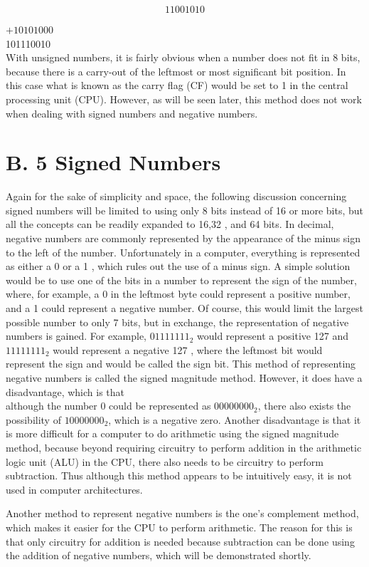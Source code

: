 \documentclass[10pt]{book}
\begin{document}
$$
11001010
$$

$+10101000$\\
101110010\\
With unsigned numbers, it is fairly obvious when a number does not fit in 8 bits, because there is a carry-out of the leftmost or most significant bit position. In this case what is known as the carry flag (CF) would be set to 1 in the central processing unit (CPU). However, as will be seen later, this method does not work when dealing with signed numbers and negative numbers.

\section{B. 5 Signed Numbers}
Again for the sake of simplicity and space, the following discussion concerning signed numbers will be limited to using only 8 bits instead of 16 or more bits, but all the concepts can be readily expanded to 16,32 , and 64 bits. In decimal, negative numbers are commonly represented by the appearance of the minus sign to the left of the number. Unfortunately in a computer, everything is represented as either a 0 or a 1 , which rules out the use of a minus sign. A simple solution would be to use one of the bits in a number to represent the sign of the number, where, for example, a 0 in the leftmost byte could represent a positive number, and a 1 could represent a negative number. Of course, this would limit the largest possible number to only 7 bits, but in exchange, the representation of negative numbers is gained. For example, $01111111_{2}$ would represent a positive 127 and $11111111_{2}$ would represent a negative 127 , where the leftmost bit would represent the sign and would be called the sign bit. This method of representing negative numbers is called the signed magnitude method. However, it does have a disadvantage, which is that\\
although the number 0 could be represented as $00000000_{2}$, there also exists the possibility of $10000000_{2}$, which is a negative zero. Another disadvantage is that it is more difficult for a computer to do arithmetic using the signed magnitude method, because beyond requiring circuitry to perform addition in the arithmetic logic unit (ALU) in the CPU, there also needs to be circuitry to perform subtraction. Thus although this method appears to be intuitively easy, it is not used in computer architectures.

Another method to represent negative numbers is the one's complement method, which makes it easier for the CPU to perform arithmetic. The reason for this is that only circuitry for addition is needed because subtraction can be done using the addition of negative numbers, which will be demonstrated shortly.
\end{document}

